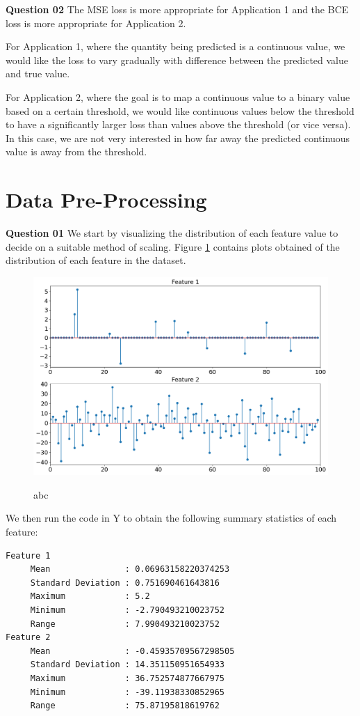 \documentclass{article}[a4paper]
\begin{document}
	\textbf{Question 02} The MSE loss is more appropriate for Application 1 and the BCE loss is more appropriate for Application 2.
	\newline

	For Application 1, where the quantity being predicted is a continuous value, we would like the loss to vary gradually with 
	difference between the predicted value and true value.
	\newline
	
	For Application 2, where the goal is to map a continuous value to a binary value based on a certain threshold, we would like
	continuous values below the threshold to have a significantly larger loss than values above the threshold (or vice versa). In this
	case, we are not very interested in how far away the predicted continuous value is away from the threshold.

	\section{Data Pre-Processing}

	\textbf{Question 01} We start by visualizing the distribution of each feature value to decide on a suitable method of scaling. Figure
	\ref{q3_1} contains plots obtained of the distribution of each feature in the dataset.

	\begin{figure}[H]
		\centering
		\includegraphics[width=0.7\linewidth]{images/q3_1.png}
		\label{q3_1}
		\caption{abc}
	\end{figure}

	We then run the code in Y to obtain the following summary statistics of each feature:
	\begin{verbatim}
Feature 1
	 Mean 				: 0.06963158220374253
	 Standard Deviation : 0.751690461643816
	 Maximum 			: 5.2
	 Minimum 			: -2.790493210023752
	 Range 				: 7.990493210023752
Feature 2
	 Mean 				: -0.45935709567298505
	 Standard Deviation : 14.351150951654933
	 Maximum 			: 36.752574877667975
	 Minimum 			: -39.11938330852965
	 Range 				: 75.87195818619762
	\end{verbatim}
\end{document}
